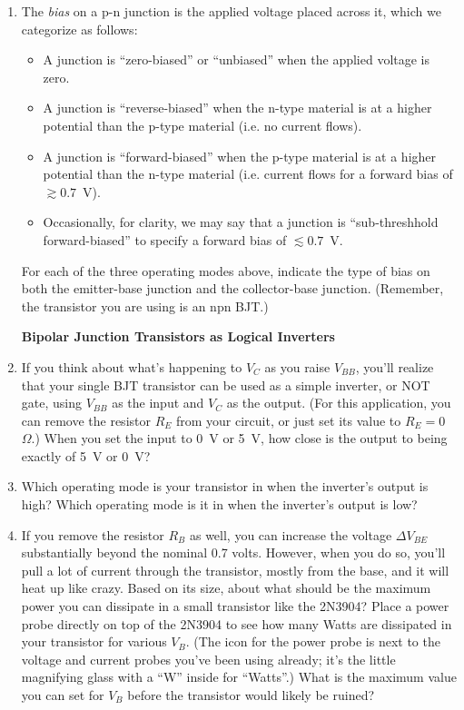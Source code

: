 \begin{enumerate}[wide]
\item The \textit{bias} on a p-n junction is the applied voltage placed across it, which we categorize as follows:
\begin{itemize}[nosep]
\item A junction is ``zero-biased'' or ``unbiased'' when the applied voltage is zero.
\item A junction is ``reverse-biased'' when the n-type material is at a higher potential than the p-type material (i.e. no current flows).
\item A junction is ``forward-biased'' when the p-type material is at a higher potential than the n-type material (i.e. current flows for a forward bias of $\gtrsim 0.7$~V).
\item Occasionally, for clarity, we may say that a junction is ``sub-threshhold 
forward-biased'' to specify a forward bias of $\lesssim 0.7$~V.
\end{itemize}
For each of the three operating modes above, indicate the type of bias on both the emitter-base junction and the collector-base junction. 
(Remember, the transistor you are using is an npn BJT.)

\pagebreak[3]
\textbf{Bipolar Junction Transistors as Logical Inverters}

\item If you think about what's happening to $V_C$ as you raise $V_{BB}$, you'll realize that your single BJT transistor can be used as a simple inverter, or NOT gate, using $V_{BB}$ as the input and $V_C$ as the output.  (For this application, you can remove the resistor $R_E$ from your circuit, or just set its value to $R_E = 0$~$\Omega$.)  When you set the input to 0~V or 5~V, how close is the output to being exactly of 5~V or 0~V?  

\item Which operating mode is your transistor in when the inverter's output is high?  Which operating mode is it in when  the inverter's output is low?  

\item If you remove the resistor $R_B$ as well, you can increase the voltage $\Delta V_{BE}$ substantially beyond the nominal 0.7 volts.  However, when you do so, you'll pull a lot of current through the transistor, mostly from the base, and it will heat up like crazy.  Based on its size, about what should be the maximum power you can dissipate in a small transistor like the 2N3904?  Place a power probe directly on top of the 2N3904 to see how many Watts are dissipated in your transistor for various $V_B$.  (The icon for the power probe  is next to the voltage and current probes you've been using already; it's the little magnifying glass with a ``W'' inside for ``Watts''.)  What is the maximum value you can set for $V_B$ before the transistor would likely be ruined?


\end{enumerate}









